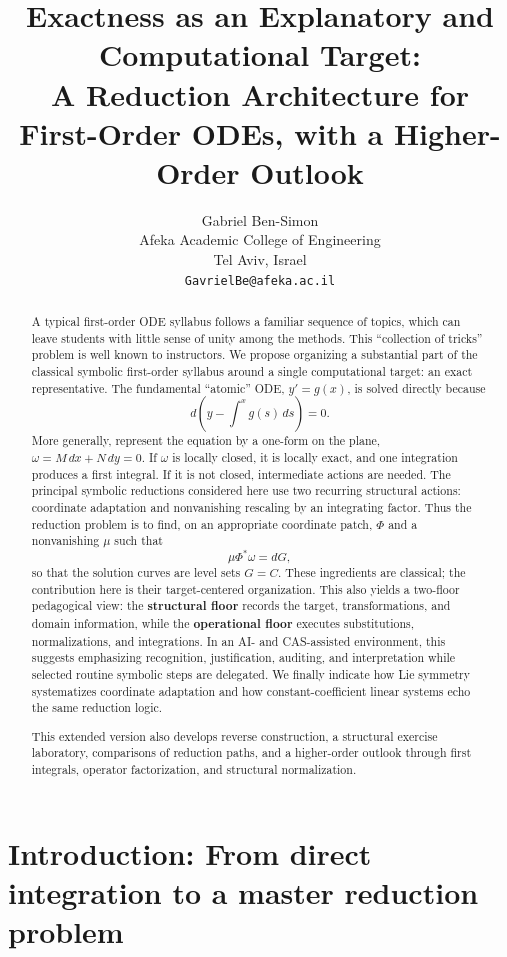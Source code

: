 \documentclass[11pt]{article}
\title{Exactness as an Explanatory and Computational Target:\\
A Reduction Architecture for First-Order ODEs, with a Higher-Order Outlook}
\author{Gabriel Ben-Simon\\
\small Afeka Academic College of Engineering\\
\small Tel Aviv, Israel\\
\texttt{GavrielBe@afeka.ac.il}}
\date{}
\theoremstyle{definition}
\begin{document}
\maketitle

\begin{abstract}
A typical first-order ODE syllabus follows a familiar sequence of topics, which can leave students with little sense of unity among the methods. This ``collection of tricks'' problem is well known to instructors. We propose organizing a substantial part of the classical symbolic first-order syllabus around a single computational target: an exact representative. The fundamental ``atomic'' ODE, \(y'=g(x)\), is solved directly because
\[
d\left(y-\int^x g(s)\,ds\right)=0.
\]
More generally, represent the equation by a one-form on the plane, \(\omega=M\,dx+N\,dy=0\). If \(\omega\) is locally closed, it is locally exact, and one integration produces a first integral. If it is not closed, intermediate actions are needed. The principal symbolic reductions considered here use two recurring structural actions: coordinate adaptation and nonvanishing rescaling by an integrating factor. Thus the reduction problem is to find, on an appropriate coordinate patch, \(\Phi\) and a nonvanishing \(\mu\) such that
\[
\mu\Phi^*\omega=dG,
\]
so that the solution curves are level sets \(G=C\). These ingredients are classical; the contribution here is their target-centered organization. This also yields a two-floor pedagogical view: the \textbf{structural floor} records the target, transformations, and domain information, while the \textbf{operational floor} executes substitutions, normalizations, and integrations. In an AI- and CAS-assisted environment, this suggests emphasizing recognition, justification, auditing, and interpretation while selected routine symbolic steps are delegated. We finally indicate how Lie symmetry systematizes coordinate adaptation and how constant-coefficient linear systems echo the same reduction logic.

This extended version also develops reverse construction, a structural exercise laboratory, comparisons of reduction paths, and a higher-order outlook through first integrals, operator factorization, and structural normalization.
\end{abstract}

\section{Introduction: From direct integration to a master reduction problem}
\end{document}
